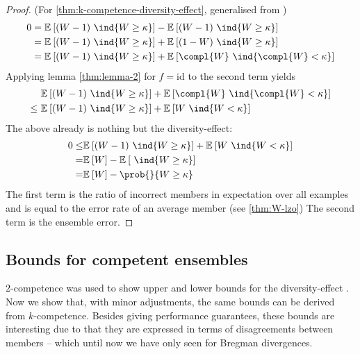 \documentclass[../main.tex]{subfiles}
\begin{document}
\begin{proof} (For \cref{thm:k-competence-diversity-effect}, generalised from \cite{theisen_WhenAreEnsembles_2023})
    \begin{align*}
        0 &= \mathbb{E}_{}\left[ (W-1)~\ind{W \geq \kappa} \right]  - \mathbb{E}_{}\left[ (W-1) ~\ind{W \geq \kappa} \right]  \\
        &= \mathbb{E}_{}\left[ (W-1)~\ind{W \geq \kappa} \right]  + \mathbb{E}_{}\left[ (1-W)~\ind{W \geq \kappa} \right]  \\
        &= \mathbb{E}_{}\left[ (W-1)~\ind{W \geq \kappa} \right]  + \mathbb{E}_{}\left[  \compl{W} ~\ind{\compl{W} < \kappa} \right]   \\
    \end{align*}
    Applying lemma \ref{thm:lemma-2} for $f = \text{id}$ to the second term yields
    \begin{align*}
        & \mathbb{E}_{}\left[ (W-1)~\ind{W \geq \kappa} \right]  + \mathbb{E}_{}\left[  \compl{W} ~\ind{\compl{W} < \kappa} \right]   \\  
        \leq~ &  \mathbb{E}_{}\left[ (W-1)~\ind{W \geq \kappa} \right]  + \mathbb{E}_{}\left[ W ~\ind{W < \kappa} \right] 
    \end{align*}
    The above already is nothing but the diversity-effect:
    \begin{align*}
        0 \leq& \mathbb{E}_{}\left[ (W-1)~\ind{W \geq \kappa} \right]  + \mathbb{E}_{}\left[ W ~\ind{W < \kappa} \right]  \\
        = & \mathbb{E}_{}\left[ W  \right]  - \mathbb{E}_{}\left[ ~\ind{W \geq \kappa} \right]  \\
        = & \mathbb{E}_{}\left[ W \right]  - \prob{}{W \geq \kappa}
    \end{align*}
    The first term is the ratio of incorrect members in expectation over all examples and is equal to the error rate of an average member (see \cref{thm:W-lzo})
    The second term is the ensemble error. 
\end{proof}

\subsection{Bounds for competent ensembles}

$2$-competence was used to show upper and lower bounds for the diversity-effect \cite{theisen_WhenAreEnsembles_2023}. Now we show that, with minor adjustments, the same bounds can be derived from $k$-competence. 
Besides giving performance guarantees, these bounds are interesting due to that they are expressed in terms of disagreements between members -- which until now we have only seen for Bregman divergences.
\end{document}
